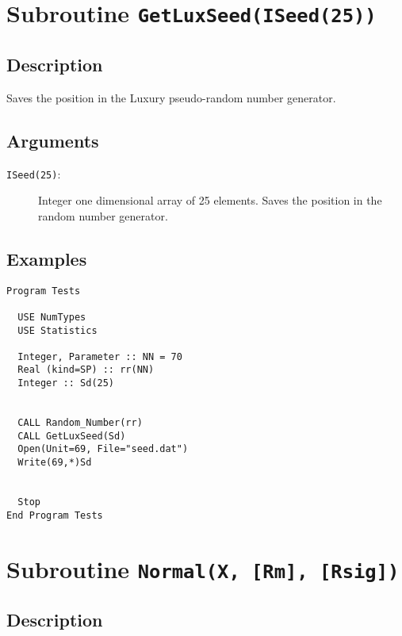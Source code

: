 \section{Subroutine \texttt{GetLuxSeed(ISeed(25))}}

\subsection{Description}

Saves the position in the Luxury pseudo-random number generator. 

\subsection{Arguments}

\begin{description}
\item[\texttt{ISeed(25)}:] Integer one dimensional array of 25
  elements. Saves the position in the random number generator.
\end{description}

\subsection{Examples}

\begin{lstlisting}[emph=GetLuxSeed,
                   emphstyle=\color{blue},
                   frame=trBL,
                   caption=Saving a point in the generating process.,
                   label=getluxseed]
Program Tests

  USE NumTypes 
  USE Statistics

  Integer, Parameter :: NN = 70
  Real (kind=SP) :: rr(NN)
  Integer :: Sd(25)


  CALL Random_Number(rr)
  CALL GetLuxSeed(Sd)
  Open(Unit=69, File="seed.dat")
  Write(69,*)Sd

  
  Stop
End Program Tests
\end{lstlisting}

\section{Subroutine \texttt{Normal(X, [Rm], [Rsig])}}

\subsection{Description}

